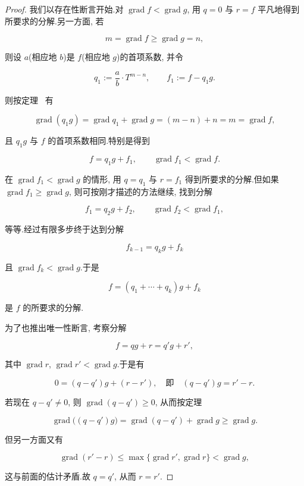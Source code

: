 \begin{proof}
我们以存在性断言开始.对 $\operatorname{grad} f < \operatorname{grad} g$, 用 $q = 0$ 与 $r = f$ 平凡地得到所要求的分解.另一方面, 若

\[
m = \operatorname{grad} f \geq \operatorname{grad} g = n,
\]

则设 $a$(相应地 $b$)是 $f$(相应地 $g$)的首项系数, 并令

\[
q_1 := \frac{a}{b} \cdot T^{m - n}, \qquad f_1 := f - q_1 g\text{.}
\]

则按定理~ 有

\[
\operatorname{grad}(q_1 g) = \operatorname{grad} q_1 + \operatorname{grad} g = (m - n) + n = m = \operatorname{grad} f,
\]

且 $q_1 g$ 与 $f$ 的首项系数相同.特别是得到

\[
f = q_1 g + f_1, \qquad \operatorname{grad} f_1 < \operatorname{grad} f\text{.}
\]

在 $\operatorname{grad} f_1 < \operatorname{grad} g$ 的情形, 用 $q = q_1$ 与 $r = f_1$ 得到所要求的分解.但如果 $\operatorname{grad} f_1 \geq \operatorname{grad} g$, 则可按刚才描述的方法继续, 找到分解

\[
f_1 = q_2 g + f_2, \qquad \operatorname{grad} f_2 < \operatorname{grad} f_1,
\]

等等.经过有限多步终于达到分解

\[
f_{k - 1} = q_k g + f_k
\]

且 $\operatorname{grad} f_k < \operatorname{grad} g$.于是

\[
f = (q_1 + \cdots + q_k) g + f_k
\]

是 $f$ 的所要求的分解.

为了也推出唯一性断言, 考察分解

\[
f = qg + r = q'g + r',
\]

其中 $\operatorname{grad} r$, $\operatorname{grad} r' < \operatorname{grad} g$.于是有

\[
0 = (q - q')g + (r - r'), \quad \text{即} \quad (q - q')g = r' - r\text{.}
\]

若现在 $q - q' \neq 0$, 则 $\operatorname{grad}(q - q') \geq 0$, 从而按定理~

\[
\operatorname{grad}\bigl((q - q')g\bigr) = \operatorname{grad}(q - q') + \operatorname{grad} g \geq \operatorname{grad} g\text{.}
\]

但另一方面又有

\[
\operatorname{grad}(r' - r) \leq \max\{\operatorname{grad} r', \operatorname{grad} r\} < \operatorname{grad} g,
\]

这与前面的估计矛盾.故 $q = q'$, 从而 $r = r'$.
\end{proof}

